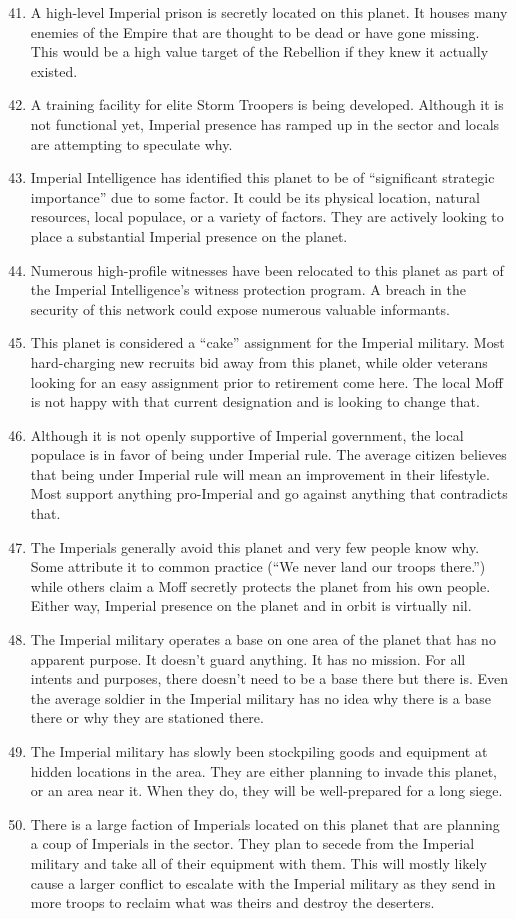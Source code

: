 \documentclass{article}
\begin{document}
\begin{enumerate}
	\setcounter{enumi}{40}
	\item A high-level Imperial prison is secretly located on this planet. It houses many enemies of the Empire that are thought to be dead or have gone missing. This would be a high value target of the Rebellion if they knew it actually existed.
	\item A training facility for elite Storm Troopers is being developed. Although it is not functional yet, Imperial presence has ramped up in the sector and locals are attempting to speculate why.
	\item Imperial Intelligence has identified this planet to be of “significant strategic importance” due to some factor. It could be its physical location, natural resources, local populace, or a variety of factors. They are actively looking to place a substantial Imperial presence on the planet.
	\item Numerous high-profile witnesses have been relocated to this planet as part of the Imperial Intelligence’s witness protection program. A breach in the security of this network could expose numerous valuable informants.
	\item This planet is considered a “cake” assignment for the Imperial military. Most hard-charging new recruits bid away from this planet, while older veterans looking for an easy assignment prior to retirement come here. The local Moff is not happy with that current designation and is looking to change that.
	\item Although it is not openly supportive of Imperial government, the local populace is in favor of being under Imperial rule. The average citizen believes that being under Imperial rule will mean an improvement in their lifestyle. Most support anything pro-Imperial and go against anything that contradicts that.
	\item The Imperials generally avoid this planet and very few people know why. Some attribute it to common practice (“We never land our troops there.”) while others claim a Moff secretly protects the planet from his own people. Either way, Imperial presence on the planet and in orbit is virtually nil.
	\item The Imperial military operates a base on one area of the planet that has no apparent purpose. It doesn’t guard anything. It has no mission. For all intents and purposes, there doesn’t need to be a base there but there is. Even the average soldier in the Imperial military has no idea why there is a base there or why they are stationed there.
	\item The Imperial military has slowly been stockpiling goods and equipment at hidden locations in the area. They are either planning to invade this planet, or an area near it. When they do, they will be well-prepared for a long siege.
	\item There is a large faction of Imperials located on this planet that are planning a coup of Imperials in the sector. They plan to secede from the Imperial military and take all of their equipment with them. This will mostly likely cause a larger conflict to escalate with the Imperial military as they send in more troops to reclaim what was theirs and destroy the deserters.
\end{enumerate}
\end{document}
